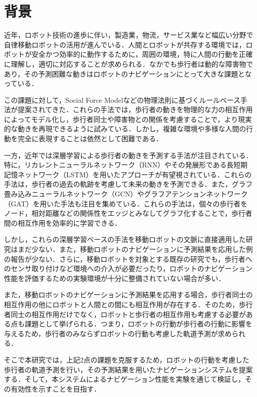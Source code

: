 
\section{背景}
近年，ロボット技術の進歩に伴い，製造業，物流，サービス業など幅広い分野で自律移動ロボットの活用が進んでいる．人間とロボットが共存する環境では，ロボットが安全かつ効率的に動作するために，周囲の環境，特に人間の行動を正確に理解し，適切に対応することが求められる．なかでも歩行者は動的な障害物であり，その予測困難な動きはロボットのナビゲーションにとって大きな課題となっている．

この課題に対して，Social Force Model\cite{s-lstm}などの物理法則に基づくルールベース手法が提案されてきた．これらの手法では，歩行者の動きを物理的な力の相互作用によってモデル化し，歩行者同士や障害物との関係を考慮することで，より現実的な動きを再現できるように試みている．しかし，複雑な環境や多様な人間の行動を完全に表現することは依然として困難である．

一方，近年では深層学習による歩行者の動きを予測する手法が注目されている．特に，リカレントニューラルネットワーク（RNN）\cite{rumelhart1986learning1,rumelhart1986learning2}やその発展形である長短期記憶ネットワーク（LSTM）\cite{hochreiter1997long}を用いたアプローチが有望視されている．これらの手法は，歩行者の過去の軌跡を考慮して未来の動きを予測できる．また，グラフ畳み込みニューラルネットワーク（GCN）\cite{kipf2016semi-gcn}やグラフアテンションネットワーク（GAT）\cite{velickovic2017graph-gat}を用いた手法も注目を集めている．これらの手法は，個々の歩行者をノード，相対距離などの関係性をエッジとみなしてグラフ化することで，歩行者間の相互作用を効率的に学習できる．

しかし，これらの深層学習ベースの手法を移動ロボットの文脈に直接適用した研究はまだ少ない．また，移動ロボットのナビゲーションに予測結果を応用した例の報告が少ない．さらに，移動ロボットを対象とする既存の研究でも，歩行者へのセンサ取り付けなど環境への介入が必要だったり，ロボットのナビゲーション性能を評価するための実験環境が十分に整備されていない場合が多い．

また，移動ロボットのナビゲーションに予測結果を応用する場合，歩行者同士の相互作用の他にロボットと人間との間にも相互作用が存在する．そのため，歩行者同士の相互作用だけでなく，ロボットと歩行者の相互作用も考慮する必要がある点も課題として挙げられる．つまり，ロボットの行動が歩行者の行動に影響を与えるため，歩行者のみならずロボットの行動も考慮した軌道予測が求められる．

そこで本研究では，上記2点の課題を克服するため，ロボットの行動を考慮した歩行者の軌道予測を行い，その予測結果を用いたナビゲーションシステムを提案する．そして，本システムによるナビゲーション性能を実験を通じて検証し，その有効性を示すことを目指す．

\newpage
